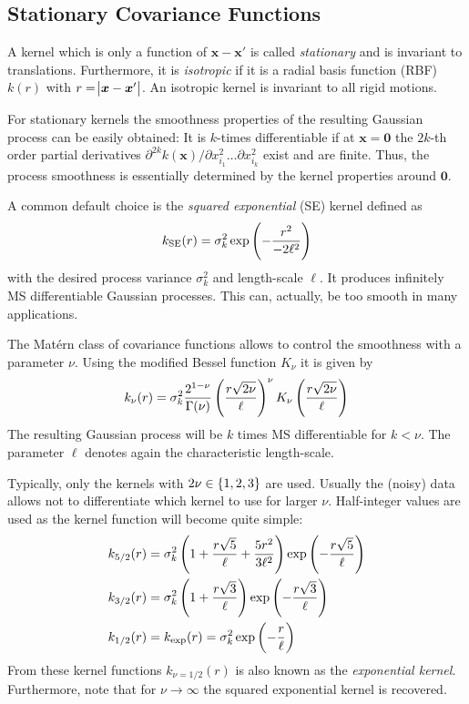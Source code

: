 \documentclass[11pt,a4paper]{scrreprt}
\newcommand{\vc}[1]{\bm{#1}}
\newcommand{\newterm}[1]{\emph{#1}}
\begin{document}
\subsection{Stationary Covariance Functions}
A kernel which is only a function of $\vc x - \vc x'$ is called 
\newterm{stationary} and is invariant to translations. Furthermore, it is 
\newterm{isotropic} if it is a radial basis function (RBF) $k(r)$ with $r 
= \abs{\vc x - \vc x'}$.  An isotropic kernel is invariant to all rigid motions.

For stationary kernels the smoothness properties of the resulting Gaussian 
process can be easily obtained: It is $k$-times differentiable if at $\vc 
x = \vc 0$ the $2k$-th order partial derivatives $\partial^{2k} k(\vc x) 
/ \partial x_{i_1}^2 \dots \partial x_{i_k}^2$ exist and are finite. Thus, the 
process smoothness is essentially determined by the kernel properties around 
$\vc 0$.

A common default choice is the \newterm{squared exponential} (SE) kernel defined 
as
\begin{equation}
    k_{\text{SE}}(r) = \sigma_k^2 \exp\del{-\frac{r^2}{-2\ell^2}}
\end{equation}
with the desired process variance $\sigma_k^2$ and length-scale $\ell$. It 
produces infinitely MS differentiable Gaussian processes. This can, actually, be 
too smooth in many applications.

The Mat\'ern class of covariance functions allows to control the smoothness with 
a parameter $\nu$. Using the modified Bessel function $K_{\nu}$ it is given by
\begin{equation}
    k_{\nu}(r) = \sigma_k^2 \frac{2^{1-\nu}}{\Gamma(\nu)} 
    \del{\frac{r\sqrt{2\nu}}{\ell}}^{\nu} K_{\nu} 
    \del{\frac{r\sqrt{2\nu}}{\ell}}
\end{equation}
The resulting Gaussian process will be $k$ times MS differentiable for $k 
< \nu$. The parameter $\ell$ denotes again the characteristic length-scale.

Typically, only the kernels with $2\nu \in \cbr{1, 2, 3}$ are used.  Usually the 
(noisy) data allows not to differentiate which kernel to use for larger $\nu$.  
Half-integer values are used as the kernel function will become quite simple:
\begin{align}
    k_{5/2}(r) &= \sigma_k^2 \del{1 + \frac{r\sqrt{5}}{\ell} 
        + \frac{5r^2}{3\ell^2}} \exp\del{-\frac{r\sqrt{5}}{\ell}} \\
    k_{3/2}(r) &= \sigma_k^2 \del{1 + \frac{r\sqrt{3}}{\ell}} 
    \exp\del{-\frac{r\sqrt{3}}{\ell}} \\
    k_{1/2}(r) &= k_{\exp}(r) = \sigma_k^2 \exp\del{-\frac{r}{\ell}}
\end{align}
From these kernel functions $k_{\nu=1/2}(r)$ is also known as the 
\newterm{exponential kernel}. Furthermore, note that for $\nu \rightarrow 
\infty$ the squared exponential kernel is recovered.
\end{document}
